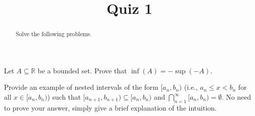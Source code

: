 \documentclass{ximera}
\begin{document}
    \title{Quiz 1}
    \begin{abstract} Solve the following problems. \end{abstract}
    \maketitle

\begin{exercise}
    Let $A\subseteq \mathbb{R}$ be a bounded set.  Prove that $\inf{(A)} = - \sup{(-A)}$.
\end{exercise}
\newpage
\begin{exercise}
    Provide an example of nested intervals of the form $[a_n,b_n)$ (i.e., $a_n \leq x < b_n$ for all $x \in [a_n,b_n)$) such that $[a_{n+1},b_{n+1}) \subseteq [a_n,b_n)$ and $\bigcap\limits_{n=1}^\infty [a_n,b_n) = \emptyset$.  No need to prove your answer, simply give a brief explanation of the intuition.
\end{exercise}
\end{document}
